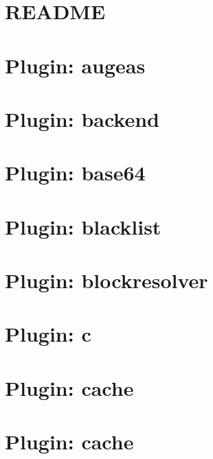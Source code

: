 \let\mypdfximage\pdfximage\def\pdfximage{\immediate\mypdfximage}\documentclass[twoside]{book}
\newcommand{\+}{\discretionary{\mbox{\scriptsize$\hookleftarrow$}}{}{}}
\begin{document}
\chapter{README}
\label{md_src_bindings_io_doc_README}

\chapter{Plugin\+: augeas}
\label{md_src_plugins_augeas_README}

\chapter{Plugin\+: backend}
\label{md_src_plugins_backend_README}

\chapter{Plugin\+: base64}
\label{md_src_plugins_base64_README}

\chapter{Plugin\+: blacklist}
\label{md_src_plugins_blacklist_README}

\chapter{Plugin\+: blockresolver}
\label{md_src_plugins_blockresolver_README}

\chapter{Plugin\+: c}
\label{md_src_plugins_c_README}

\chapter{Plugin\+: cache}
\label{md_src_plugins_cache_README}

\chapter{Plugin\+: cache}
\label{md_src_plugins_cache_shelltests}

\end{document}
